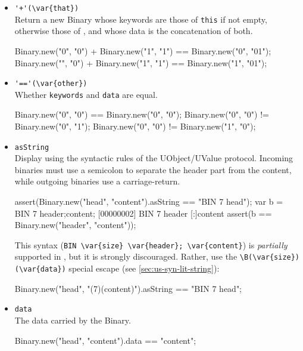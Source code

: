 \begin{itemize}
\item \lstinline|'+'(\var{that})|\\
  Return a new Binary whose keywords are those of \lstinline|this| if
  not empty, otherwise those of , and whose data is the
  concatenation of both.
\begin{urbiassert}[firstnumber=last]
Binary.new("0", "0") + Binary.new("1", "1")
       == Binary.new("0", "01");
Binary.new("", "0") + Binary.new("1", "1")
       == Binary.new("1", "01");
\end{urbiassert}

\item \lstinline|'=='(\var{other})|\\
  Whether \lstinline|keywords| and \lstinline|data| are equal.
\begin{urbiassert}[firstnumber=last]
Binary.new("0", "0") == Binary.new("0", "0");
Binary.new("0", "0") != Binary.new("0", "1");
Binary.new("0", "0") != Binary.new("1", "0");
\end{urbiassert}

\item \lstinline|asString|\\
  Display using the syntactic rules of the UObject/UValue protocol.
  Incoming binaries must use a semicolon to separate the header part
  from the content, while outgoing binaries use a carriage-return.
\begin{urbiscript}[firstnumber=last]
assert(Binary.new("head", "content").asString
       == "BIN 7 head\ncontent");
var b = BIN 7 header;content;
[00000002] BIN 7 header
[:]content
assert(b == Binary.new("header", "content"));
\end{urbiscript}

This syntax (\lstinline|BIN \var{size} \var{header}; \var{content}|)
is \emph{partially} supported in \us, but it is strongly discouraged.
Rather, use the \lstinline|\B(\var{size})(\var{data})| special escape
(see \autoref{sec:us-syn-lit-string}):

\begin{urbiassert}[firstnumber=last]
Binary.new("head", "\B(7)(content)").asString
       == "BIN 7 head\ncontent";
\end{urbiassert}


\item \lstinline|data|\\
  The data carried by the Binary.
\begin{urbiassert}[firstnumber=last]
Binary.new("head", "content").data == "content";
\end{urbiassert}


\end{itemize}

